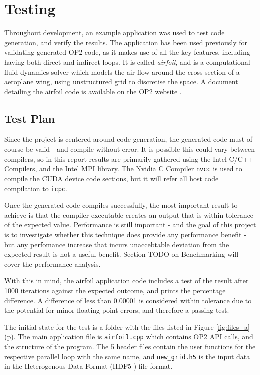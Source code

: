 
\section{Testing}
Throughout development, an example application was used to test code generation, and verify the results. The application has been used previously for validating generated OP2 code, as it makes use of all the key features, including having both direct and indirect loops. It is called \textit{airfoil}, and is a computational fluid dynamics solver which models the air flow around the cross section of a aeroplane wing, using unstructured grid to discretise the space. A document detailing the airfoil code is available on the OP2 website \cite{airfoil}.

\subsection{Test Plan}
Since the project is centered around code generation, the generated code must of course be valid - and compile without error. It is possible this could vary between compilers, so in this report results are primarily gathered using the Intel C/C++ Compilers, and the Intel MPI library. The Nvidia C Compiler \verb|nvcc| is used to compile the CUDA device code sections, but it will refer all host code compilation to \verb|icpc|.
\par
Once the generated code compiles successfully, the most important result to achieve is that the compiler executable creates an output that is within tolerance of the expected value. Performance is still important - and the goal of this project is to investigate whether this technique does provide any performance benefit - but any perfomance increase that incurs unaccebtable deviation from the expected result is not a useful benefit. Section TODO on Benchmarking will cover the performance analysis.
\par
With this in mind, the airfoil application code includes a test of the result after 1000 iterations against the expected outcome, and prints the percentage difference. A difference of less than 0.00001 is considered within tolerance due to the potential for minor floating point errors, and therefore a passing test.
\par
The initial state for the test is a folder with the files listed in Figure \ref{fig:files_a} (p\pageref{fig:files_a}). The main application file is \verb|airfoil.cpp| which contains OP2 API calls, and the structure of the program. The 5 header files contain the user functions for the respective parallel loop with the same name, and \verb|new_grid.h5| is the input data in the Heterogenous Data Format (HDF5 \cite{HDF5}) file format.

